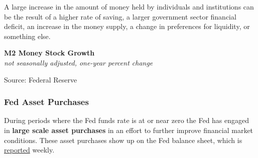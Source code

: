 \documentclass{report}
\makeatletter
\newcommand{\tbllink}[1]{\href{https://raw.githubusercontent.com/bdecon/US-chartbook/master/chartbook/data/#1}{\faTable}}
\newcommand*\short[1]{\expandafter\@gobbletwo\number\numexpr#1\relax}
\newcommand{\dateaxisticks}{
		date coordinates in=x, axis line style={draw=none},
		xmax={2022-10-31},
		max space between ticks=40,	    
		xtick={{1990-01-01}, {1992-01-01}, {1994-01-01}, 
			{1996-01-01}, {1998-01-01}, {2000-01-01}, 
			{2002-01-01}, {2004-01-01}, {2006-01-01},
			{2008-01-01}, {2010-01-01}, {2012-01-01}, {2014-01-01},
		    {2016-01-01}, {2018-01-01}, {2020-01-01}, {2022-01-01}, 
		    {2024-01-01}, {2026-01-01}},
		minor xtick={{1989-01-01}, {1991-01-01}, {1993-01-01},
			{1995-01-01}, {1997-01-01}, {1999-01-01}, 
			{2001-01-01}, {2003-01-01}, {2005-01-01}, {2007-01-01},
		    {2009-01-01}, {2011-01-01}, {2013-01-01}, {2015-01-01},
		    {2017-01-01}, {2019-01-01}, {2021-01-01}, {2023-01-01}, 
		    {2025-01-01}, {2027-01-01}},
		enlarge y limits={0.06}, enlarge x limits={0.01},
		}
\newcommand{\bbar}[2]{extra #1 ticks = {{#2}}, extra #1 tick labels = ,
		extra #1 tick style = {grid=major, grid style={thick, black!25}},}
\newcommand{\thickline}[4]{\addplot[ultra thick, no markers, color=#1] 
		table [x=#2, y=#3, col sep=comma] {#4};	}
\newcommand{\rbars}{
		\fill[color=black!10] (axis cs:{1990-07-01},\pgfkeysvalueof{/pgfplots/ymin}) rectangle 
			(axis cs:{1991-03-01}, \pgfkeysvalueof{/pgfplots/ymax});
		\fill[color=black!10] (axis cs:{2007-12-01},\pgfkeysvalueof{/pgfplots/ymin}) rectangle 
			(axis cs:{2009-07-01}, \pgfkeysvalueof{/pgfplots/ymax});
		\fill[color=black!10] (axis cs:{2001-03-01},\pgfkeysvalueof{/pgfplots/ymin}) rectangle 
			(axis cs:{2001-11-01}, \pgfkeysvalueof{/pgfplots/ymax});
		\fill[color=black!10] (axis cs:{2020-02-01},\pgfkeysvalueof{/pgfplots/ymin}) rectangle 
			(axis cs:{2020-05-01}, \pgfkeysvalueof{/pgfplots/ymax});}
\makeatother
\begin{document}
{\begin{minipage}{0.76\textwidth}
A large increase in the amount of money held by individuals and institutions can be the result of a higher rate of saving, a larger government sector financial deficit, an increase in the money supply, a change in preferences for liquidity, or something else. 
\vspace{2mm}

\normalsize \textbf{M2 Money Stock Growth}\\
\footnotesize{\textit{not seasonally adjusted, one-year percent change}}
\vspace{3.2cm}

\hspace*{4mm} 

\footnotesize{Source: Federal Reserve} \hfill \tbllink{m2.csv}
\end{minipage}
\newpage
\begin{minipage}{0.76\textwidth}
\subsubsection*{Fed Asset Purchases}
\small During periods where the Fed funds rate is at or near zero the Fed has engaged in \textbf{large scale asset purchases} in an effort to further improve financial market conditions. These asset purchases show up on the Fed balance sheet, which is \href{https://www.federalreserve.gov/releases/h41/current/default.htm}{reported} weekly. 




\end{minipage}

}
\end{document}
